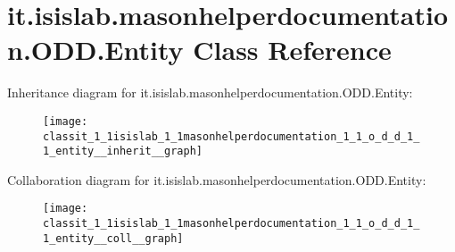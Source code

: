 \hypertarget{classit_1_1isislab_1_1masonhelperdocumentation_1_1_o_d_d_1_1_entity}{\section{it.\-isislab.\-masonhelperdocumentation.\-O\-D\-D.\-Entity Class Reference}
\label{classit_1_1isislab_1_1masonhelperdocumentation_1_1_o_d_d_1_1_entity}
}


Inheritance diagram for it.\-isislab.\-masonhelperdocumentation.\-O\-D\-D.\-Entity\-:\nopagebreak
\begin{figure}[H]
\begin{center}
\leavevmode
\texttt{[image: classit\_1\_1isislab\_1\_1masonhelperdocumentation\_1\_1\_o\_d\_d\_1\_1\_entity\_\_inherit\_\_graph]}
\end{center}
\end{figure}


Collaboration diagram for it.\-isislab.\-masonhelperdocumentation.\-O\-D\-D.\-Entity\-:\nopagebreak
\begin{figure}[H]
\begin{center}
\leavevmode
\texttt{[image: classit\_1\_1isislab\_1\_1masonhelperdocumentation\_1\_1\_o\_d\_d\_1\_1\_entity\_\_coll\_\_graph]}
\end{center}
\end{figure}
